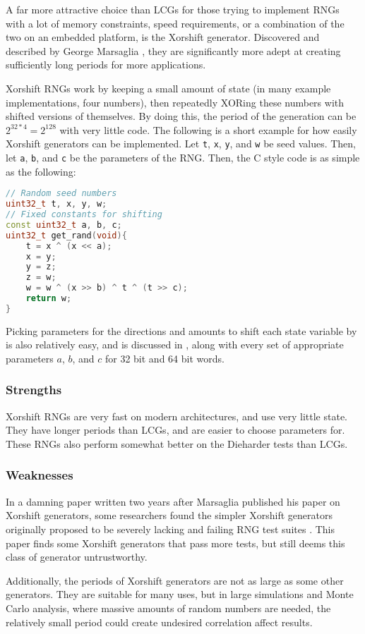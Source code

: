 A far more attractive choice than LCGs for those trying to implement RNGs with a lot of memory constraints, speed requirements, or a combination of the two on an embedded platform, is the Xorshift generator. Discovered and described by George Marsaglia \cite{marsaglia2003xorshift}, they are significantly more adept at creating sufficiently long periods for more applications.

Xorshift RNGs work by keeping a small amount of state (in many example implementations, four numbers), then repeatedly XORing these numbers with shifted versions of themselves. By doing this, the period of the generation can be $2^{32 * 4} = 2^{128}$ with very little code. The following is a short example for how easily Xorshift generators can be implemented. Let \texttt{t}, \texttt{x}, \texttt{y}, and \texttt{w} be seed values. Then, let \texttt{a}, \texttt{b}, and \texttt{c} be the parameters of the RNG. Then, the C style code is as simple as the following:

\begin{lstlisting}[frame=single,language=C++,basicstyle=\ttfamily]
// Random seed numbers
uint32_t t, x, y, w;
// Fixed constants for shifting
const uint32_t a, b, c;
uint32_t get_rand(void){
    t = x ^ (x << a);
    x = y;
    y = z;
    z = w;
    w = w ^ (x >> b) ^ t ^ (t >> c);
    return w;
}
\end{lstlisting}

Picking parameters for the directions and amounts to shift each state variable by is also relatively easy, and is discussed in \cite{marsaglia2003xorshift}, along with every set of appropriate parameters $a$, $b$, and $c$ for 32 bit and 64 bit words.

\subsubsection{Strengths}

Xorshift RNGs are very fast on modern architectures, and use very little state. They have longer periods than LCGs, and are easier to choose parameters for. These RNGs also perform somewhat better on the Dieharder tests than LCGs.

\subsubsection{Weaknesses}

In a damning paper written two years after Marsaglia published his paper on Xorshift generators, some researchers found the simpler Xorshift generators originally proposed to be severely lacking and failing RNG test suites \cite{panneton2005xorshift}. This paper finds some Xorshift generators that pass more tests, but still deems this class of generator untrustworthy.

Additionally, the periods of Xorshift generators are not as large as some other generators. They are suitable for many uses, but in large simulations and Monte Carlo analysis, where massive amounts of random numbers are needed, the relatively small period could create undesired correlation affect results.

